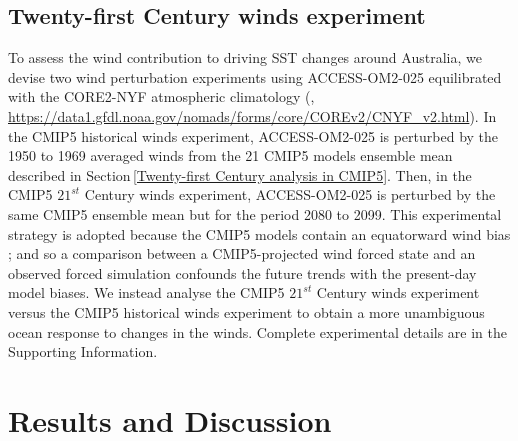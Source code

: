 \documentclass[draft,linenumbers]{agujournal2018}
\begin{document}
\subsection{Twenty-first Century winds experiment} \label{Twenty-first Century winds experiment}
To assess the wind contribution to driving SST changes around Australia, we devise two wind perturbation experiments using ACCESS-OM2-025 equilibrated with the CORE2-NYF atmospheric climatology (\citealp{Large2009},  \url{https://data1.gfdl.noaa.gov/nomads/forms/core/COREv2/CNYF_v2.html}). In the CMIP5 historical winds experiment, ACCESS-OM2-025 is perturbed by the 1950 to 1969 averaged winds from the 21 CMIP5 models ensemble mean described in Section\,\ref{Twenty-first Century analysis in CMIP5}. Then, in the CMIP5 $21^{st}$ Century winds experiment, ACCESS-OM2-025 is perturbed by the same CMIP5 ensemble mean but for the period 2080 to 2099. This experimental strategy is adopted because the CMIP5 models contain an equatorward wind bias \citep{Bracegirdle2013}; and so a comparison between a CMIP5-projected wind forced state and an observed forced simulation confounds the future trends with the present-day model biases. We instead analyse the CMIP5 $21^{st}$ Century winds experiment versus the CMIP5 historical winds experiment to obtain a more unambiguous ocean response to changes in the winds. Complete experimental details are in the Supporting Information.

\section{Results and Discussion}
\end{document}
